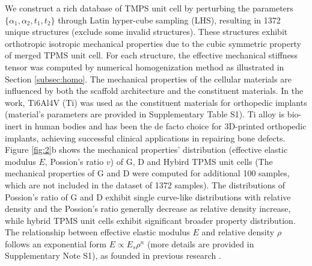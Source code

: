 \documentclass[preprint,review,12pt,authoryear]{elsarticle}
\begin{document}
We construct a rich database of TMPS unit cell by perturbing the parameters $\{\alpha_1, \alpha_2, t_1, t_2\} $ through Latin hyper-cube sampling (LHS), resulting in 1372 unique structures (exclude some invalid structures). These structures exhibit orthotropic isotropic mechanical properties due to the cubic symmetric property of merged TPMS unit cell. For each structure, the effective mechanical stiffness tensor was computed by numerical homogenization method as illustrated in Section \ref{subsec:homo}. The mechanical properties of the cellular materials are influenced by both the scaffold architecture and the constituent materials. In the work, Ti6Al4V (Ti) was used as the constituent materials for orthopedic implants \citep{Peng2023} (material's parameters are provided in Supplementary Table S1). Ti alloy is bio-inert in human bodies and has been the de facto choice for 3D-printed orthopedic implants, achieving successful clinical applications in repairing bone defects. Figure \ref{fig:2}b shows the mechanical properties' distribution (effective elastic modulus $E$, Possion's ratio $v$) of G, D and Hybird TPMS unit cells (The mechanical properties of G and D were computed for additional 100 samples, which are not included in the dataset of 1372 samples). The distributions of Possion's ratio of G and D exhibit single curve-like distributions with relative density and the Possion's ratio generally decrease as relative density increase, while hybrid TPMS unit cells exhibit significant broader property distribution. The relationship between effective elastic modulus $E$ and relative density $\rho$ follows an exponential form $E \propto E_s\rho^{n}$ (more details are provided in Supplementary Note S1), as founded in previous research \citep{Bauer2017}.
\end{document}
